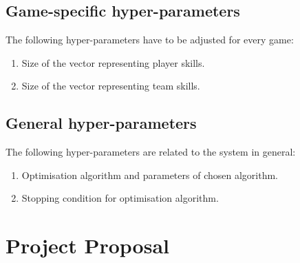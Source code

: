 \documentclass[12pt,a4paper]{book}
\begin{document}
\section{Game-specific hyper-parameters}
The following hyper-parameters have to be adjusted for every game:
\begin{enumerate}
\item Size of the vector representing player skills.
\item Size of the vector representing team skills.
\end{enumerate}
\section{General hyper-parameters}
The following hyper-parameters are related to the system in general:
\begin{enumerate}
\item Optimisation algorithm and parameters of chosen algorithm.
\item Stopping condition for optimisation algorithm.
\end{enumerate}

\chapter{Project Proposal}
\end{document}
